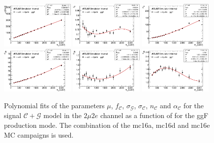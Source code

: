 \begin{figure}[htbp]
    \centering
    \includegraphics[width=0.32\textwidth]{figures/HMHZZ/signal/NWA//ggf_graph_mass_mean_2mu2e_fit.eps}
    \includegraphics[width=0.32\textwidth]{figures/HMHZZ/signal/NWA//ggf_graph_f_cb_gauss_2mu2e_fit.eps}
    \includegraphics[width=0.32\textwidth]{figures/HMHZZ/signal/NWA//ggf_graph_mass_gauss_sigma_2mu2e_fit.eps} \\
    \includegraphics[width=0.32\textwidth]{figures/HMHZZ/signal/NWA//ggf_graph_mass_cb_sigma_2mu2e_fit.eps}
    \includegraphics[width=0.32\textwidth]{figures/HMHZZ/signal/NWA//ggf_graph_mass_cb_alpha_2mu2e_fit.eps}
    \includegraphics[width=0.32\textwidth]{figures/HMHZZ/signal/NWA//ggf_graph_mass_cb_n_2mu2e_fit.eps}
    \caption{Polynomial fits of the parameters $\mu$, $f_{\mathcal{C}}$, $\sigma_{\mathcal{G}}$, $\sigma_{\mathcal{C}}$,
    $n_{\mathcal{C}}$ and $\alpha_{\mathcal{C}}$ for the signal $\mathcal{C}+\mathcal{G}$ model in the $2\mu 2e$ channel as a function of \mH for
    the ggF production mode. The combination of the mc16a, mc16d and mc16e MC campaigns is used.}
    \label{fig:ggf_fitParams_interpolation_2mu2e}
\end{figure}

